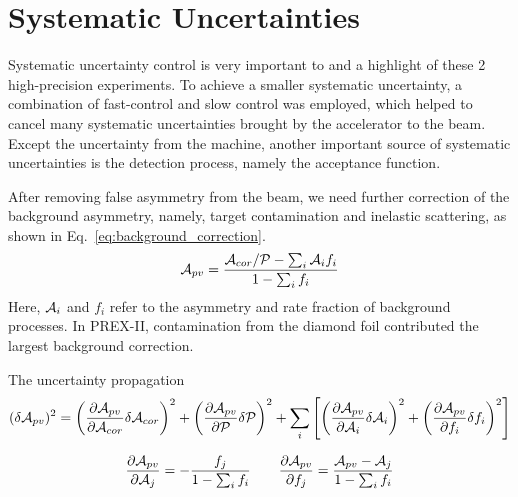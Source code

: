 \chapter{Systematic Uncertainties}

Systematic uncertainty control is very important to and a highlight of these 2
high-precision experiments. To achieve a smaller systematic uncertainty, a
combination of fast-control and slow control was employed, which helped 
to cancel many systematic uncertainties brought by the accelerator to the
beam. Except the uncertainty from the machine, another important source
of systematic uncertainties is the detection process, namely the 
acceptance function.

After removing false asymmetry from the beam, we need further correction of the
background asymmetry, namely, target contamination and inelastic scattering,
as shown in Eq.~\ref{eq:background_correction}.
\begin{equation}
    \mathcal{A}_{pv} = \frac{\mathcal{A}_{cor}/\mathcal{P} - \sum_i \mathcal{A}_i f_i}{1 - \sum_i f_i}
    \label{eq:background_correction}
\end{equation}
Here, $\mathcal{A}_i$ and $f_i$ refer to the asymmetry and rate fraction of background
processes. In PREX-II, contamination from the diamond foil contributed the
largest background correction.

The uncertainty propagation
\begin{equation}
    (\delta \mathcal{A}_{pv})^2 = 
      \left( \frac{\partial \mathcal{A}_{pv}}{\partial \mathcal{A}_{cor}} \delta \mathcal{A}_{cor} \right)^2
      + \left( \frac{\partial \mathcal{A}_{pv}}{\partial \mathcal{P}} \delta \mathcal{P} \right)^2
      + \sum_i \left[ \left(\frac{\partial \mathcal{A}_{pv}}{\partial \mathcal{A}_i}\delta \mathcal{A}_i \right)^2 
	 + \left(\frac{\partial \mathcal{A}_{pv}}{\partial f_i}\delta f_i \right)^2 \right]
\end{equation}

\begin{equation}
    \frac{\partial \mathcal{A}_{pv}}{\partial \mathcal{A}_j} = -\frac{f_j}{1 - \sum_i f_i}  \qquad
    \frac{\partial \mathcal{A}_{pv}}{\partial f_j} = \frac{\mathcal{A}_{pv} - \mathcal{A}_j}{1 - \sum_i f_i}
    \label{eq:systematic_uncertainty}
\end{equation}

